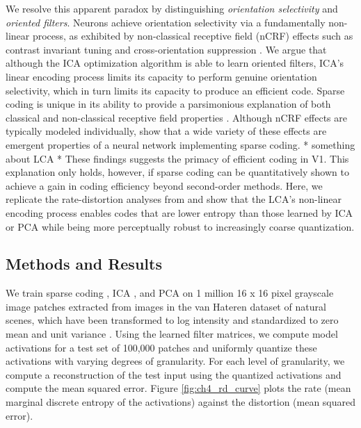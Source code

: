 We resolve this apparent paradox by distinguishing \textit{orientation selectivity} and \textit{oriented filters}. Neurons achieve orientation selectivity via a fundamentally non-linear process, as exhibited by non-classical receptive field (nCRF) effects such as contrast invariant tuning and cross-orientation suppression \parencite{ferster2000natural,  zhu2013visual}. We argue that although the ICA optimization algorithm is able to learn oriented filters, ICA's linear encoding process limits its capacity to perform genuine orientation selectivity, which in turn limits its capacity to produce an efficient code. Sparse coding is unique in its ability to provide a parsimonious explanation of both classical and non-classical receptive field properties \parencite{zhu2013visual, golden2016conjectures}. Although nCRF effects are typically modeled individually,  show that a wide variety of these effects are emergent properties of a neural network implementing sparse coding. * something about LCA * These findings suggests the primacy of efficient coding in V1. This explanation only holds, however, if sparse coding can be quantitatively shown to achieve a gain in coding efficiency beyond second-order methods. Here, we replicate the rate-distortion analyses from  and show that the LCA's non-linear encoding process enables codes that are lower entropy than those learned by ICA or PCA while being more perceptually robust to increasingly coarse quantization.


\subsection{Methods and Results}
We train sparse coding \parencite{rozell2008sparse}, ICA \parencite{bell1997independent}, and PCA on 1 million 16 x 16 pixel grayscale image patches extracted from images in the van Hateren dataset of natural scenes, which have been transformed to log intensity and standardized to zero mean and unit variance \parencite{vanHateren1998independent}. Using the learned filter matrices, we compute model activations for a test set of 100,000 patches and uniformly quantize these activations with varying degrees of granularity. For each level of granularity, we compute a reconstruction of the test input using the quantized activations and compute the mean squared error. Figure \ref{fig:ch4_rd_curve} plots the rate (mean marginal discrete entropy of the activations) against the distortion (mean squared error).

